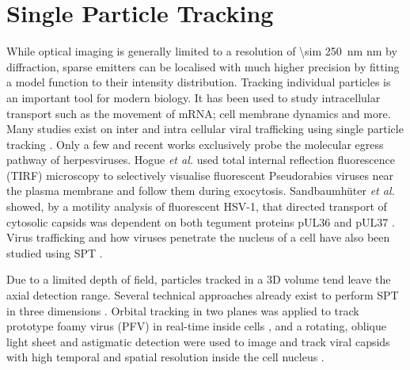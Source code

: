 \section{Single Particle Tracking}

While optical imaging is generally limited to a resolution of \SI{\sim 250}{\nano\metre} nm by diffraction, sparse emitters can be localised with much higher precision by fitting a model function to their intensity distribution.
Tracking individual particles is an important tool for modern biology.
It has been used to study intracellular transport such as the movement of mRNA\cite{Spille2015a}; cell membrane dynamics\cite{Cognet2014} and more.
Many studies exist on inter and intra cellular viral trafficking
using single particle tracking \cite{(reviewed in [43])}.
Only a few and recent works exclusively probe the molecular egress pathway of herpesviruses.
Hogue \emph{et al.} \cite{[16]} used total internal reflection fluorescence (TIRF) microscopy to selectively visualise fluorescent Pseudorabies viruses near the plasma membrane and follow them during exocytosis.
Sandbaumhüter \emph{et al.} showed, by a motility analysis of fluorescent HSV-1, that directed transport of cytosolic capsids was dependent on both tegument proteins pUL36 and pUL37 \cite{[44]}.
Virus trafficking and how viruses penetrate the nucleus of a cell have also been studied using SPT \cite{Brandenburg2007}.

Due to a limited depth of field, particles tracked in a 3D volume tend leave the axial detection range.
Several technical approaches already exist to perform SPT in three dimensions \cite{[46-49]}.
Orbital tracking in two planes was applied to track prototype foamy virus (PFV) in real-time inside cells \cite{[50]}, and a rotating, oblique light sheet and astigmatic detection were used to image and track viral capsids with high temporal and spatial resolution inside the cell nucleus \cite{[19]}.

